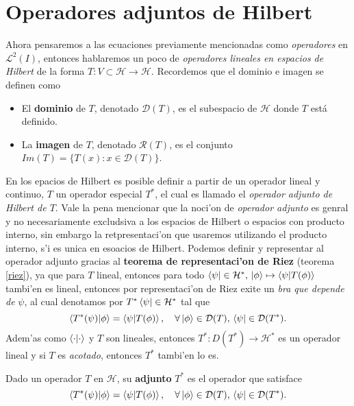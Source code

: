 \documentclass[main.tex]{subfiles}
\begin{document}
\section{Operadores adjuntos de Hilbert}
\noindent Ahora pensaremos a las ecuaciones previamente mencionadas como \emph{operadores} en \(\mathcal{L}^{2}(I)\), entonces hablaremos un poco de \emph{operadores lineales en espacios de Hilbert} de la forma $T:V\subset\mathcal{H}\to\mathcal{H}$. Recordemos que el dominio e imagen se definen como
\begin{itemize}
    \item El \textbf{dominio} de $T$, denotado $\mathcal{D}(T)$, es el subespacio de $\mathcal{H}$ donde $T$ está definido.
    \item La \textbf{imagen} de $T$, denotado $\mathcal{R}(T)$, es el conjunto $Im(T)=\{T(x) : x \in \mathcal{D}(T)\}$.
\end{itemize}
En los epacios de Hilbert es posible definir a partir de un operador lineal y continuo, \(T\) un operador especial \(T^{*}\), el cual es llamado el \emph{operador adjunto de Hilbert de \(T\)}. Vale la pena mencionar que la noci'on de \emph{operador adjunto} es genral y no necesariamente excludsiva a los espacios de Hilbert o espacios con producto interno, sin embargo la retpresentaci'on que usaremos utilizando el producto interno, s'i es unica en esoacios de Hilbert. Podemos definir y representar al operador adjunto gracias al \textbf{teorema de representaci'on de Riez} (teorema \ref{riez}), ya que para \(T\) lineal, entonces para todo \(\bra{\psi}\in\mathcal{H}^{*},\,\ket{\phi}\mapsto\braket{\psi|T(\phi)}\) tambi'en es lineal, entonces por representaci'on de Riez exite un \emph{bra que depende de} \(\psi\), al cual denotamos por \(T^{*}\bra{\psi}\in\mathcal{H}^{*}\) tal que
\[
  \braket{T^{*}(\psi)|\phi}=\braket{\psi| T(\phi)}, \quad \forall \ket{\phi} \in \mathcal{D}(T), \, \bra{\psi} \in \mathcal{D}(T^*).
\]
\noindent Adem'as como \(\braket{\cdot|\cdot}\) y \(T\) son lineales, entonces \(T^{*}:D(T^{*})\to\mathcal{H}^{*}\) es un operador lineal y si \(T\) es \emph{acotado}, entonces \(T^{*}\) tambi'en lo es.

\begin{def.}
Dado un operador $T$ en $\mathcal{H}$, su \textbf{adjunto} $T^*$ es el operador que satisface
\[
\braket{T^{*}(\psi)|\phi}=\braket{\psi| T(\phi)}, \quad \forall \ket{\phi} \in \mathcal{D}(T), \, \bra{\psi} \in \mathcal{D}(T^*).
\]
\end{def.}
\end{document}
